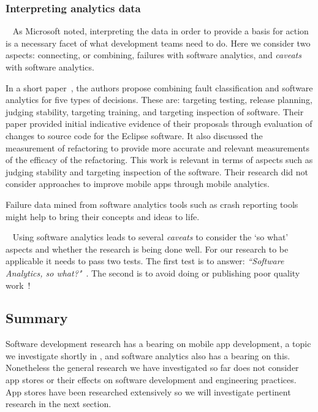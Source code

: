 \subsubsection{Interpreting analytics data}~\label{rw-interpreting-analytics-data-research}
As Microsoft noted, interpreting the data in order to provide a basis for action is a necessary facet of what development teams need to do. Here we consider two aspects: connecting, or combining, failures with software analytics, and \emph{caveats} with software analytics.

In a short paper~, the authors propose combining fault classification and software analytics for five types of decisions. These are: targeting testing, release planning, judging stability, targeting training, and targeting inspection of software. Their paper provided initial indicative evidence of their proposals through evaluation of changes to source code for the Eclipse software. It also discussed the measurement of refactoring to provide more accurate and relevant measurements of the efficacy of the refactoring. This work is relevant in terms of aspects such as judging stability and targeting inspection of the software. Their research did not consider approaches to improve mobile apps through mobile analytics. 

Failure data mined from software analytics tools such as crash reporting tools might help to bring their concepts and ideas to life.

{}~\label{rw-caveats-with-software-analytics-topic}
Using software analytics leads to several \emph{caveats} to consider the `so what' aspects and whether the research is being done well. For our research to be applicable it needs to pass two tests. The first test is to answer: 
\emph{``Software Analytics, so what?"}~. The second is to avoid doing or publishing poor quality work~!


\subsection{Summary}
Software development research has a bearing on mobile app development, a topic we investigate shortly in , and software analytics also has a bearing on this. Nonetheless the general research we have investigated so far does not consider app stores or their effects on software development and engineering practices. App stores have been researched extensively so we will investigate pertinent research in the next section.

